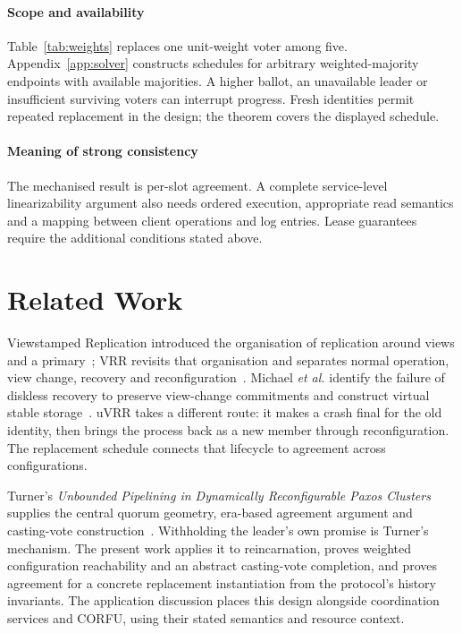 \documentclass[10pt,journal,letterpaper]{IEEEtran}
\begin{document}
\paragraph{Scope and availability}
Table~\ref{tab:weights} replaces one unit-weight voter among five. Appendix~\ref{app:solver} constructs schedules for arbitrary weighted-majority endpoints with available majorities. A higher ballot, an unavailable leader or insufficient surviving voters can interrupt progress. Fresh identities permit repeated replacement in the design; the theorem covers the displayed schedule.

\paragraph{Meaning of strong consistency}
The mechanised result is per-slot agreement. A complete service-level linearizability argument also needs ordered execution, appropriate read semantics and a mapping between client operations and log entries. Lease guarantees require the additional conditions stated above.

\section{Related Work}\label{sec:related}
Viewstamped Replication introduced the organisation of replication around views and a primary~\cite{vr}; VRR revisits that organisation and separates normal operation, view change, recovery and reconfiguration~\cite{vrr}. Michael \emph{et al.} identify the failure of diskless recovery to preserve view-change commitments and construct virtual stable storage~\cite{diskless}. uVRR takes a different route: it makes a crash final for the old identity, then brings the process back as a new member through reconfiguration. The replacement schedule connects that lifecycle to agreement across configurations.

Turner's \emph{Unbounded Pipelining in Dynamically Reconfigurable Paxos Clusters} supplies the central quorum geometry, era-based agreement argument and casting-vote construction~\cite{turner}. Withholding the leader's own promise is Turner's mechanism. The present work applies it to reincarnation, proves weighted configuration reachability and an abstract casting-vote completion, and proves agreement for a concrete replacement instantiation from the protocol's history invariants. The application discussion places this design alongside coordination services and CORFU, using their stated semantics and resource context.
\end{document}

